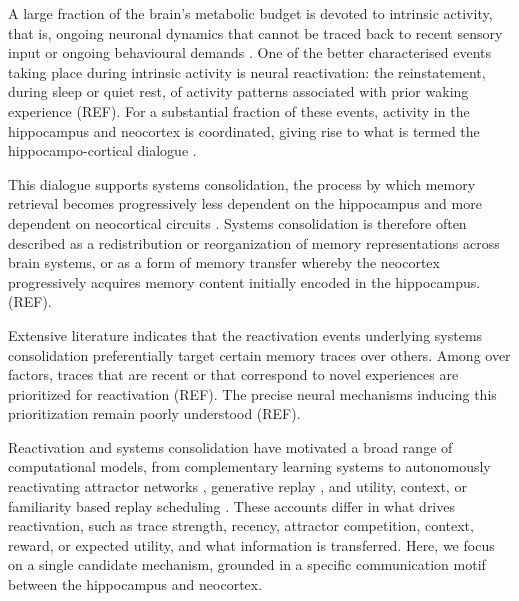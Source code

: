 \documentclass[10pt,letterpaper]{article}
\theoremstyle{plain}
\theoremstyle{remark}
\begin{document}
A large fraction of the brain's metabolic budget is devoted to intrinsic activity, that is, ongoing neuronal dynamics that cannot be traced back to recent sensory input or ongoing behavioural demands \cite{raichle2002budget,raichle2006dark}. One of the better characterised events taking place during intrinsic activity is neural reactivation: the reinstatement, during sleep or quiet rest, of activity patterns associated with prior waking experience (REF). For a substantial fraction of these events, activity in the hippocampus and neocortex is coordinated, giving rise to what is termed the hippocampo-cortical dialogue \cite{klinzing2019mechanisms,staresina2023coupled}.

This dialogue supports systems consolidation, the process by which memory retrieval becomes progressively less dependent on the hippocampus and more dependent on neocortical circuits \cite{klinzing2019mechanisms, diekelmann2010memory, squire2015consolidation, kitamura2017engrams}. Systems consolidation is therefore often described as a redistribution or reorganization of memory representations across brain systems, or as a form of memory transfer whereby the neocortex progressively acquires memory content initially encoded in the hippocampus. (REF).

Extensive literature indicates that the reactivation events underlying systems consolidation preferentially target certain memory traces over others. Among over factors, traces that are recent or that correspond to novel experiences are prioritized for reactivation (REF). The precise neural mechanisms inducing this prioritization remain poorly understood (REF). 

Reactivation and systems consolidation have motivated a broad range of computational models, from complementary learning systems \cite{mcclelland1995complementary} to autonomously reactivating attractor networks \cite{kali2004offline,fiebig2014autonomous,singh2022autonomous}, generative replay \cite{barry2022replay,spens2024generative}, and utility, context, or familiarity based replay scheduling \cite{mattar2018prioritized,diekmann2023replay,sun2023gocls,lindsey2024recall,zhou2026context}. These accounts differ in what drives reactivation, such as trace strength, recency, attractor competition, context, reward, or expected utility, and what  information is transferred. Here, we focus on a single candidate mechanism, grounded in a specific communication motif between the hippocampus and neocortex.
\end{document}
